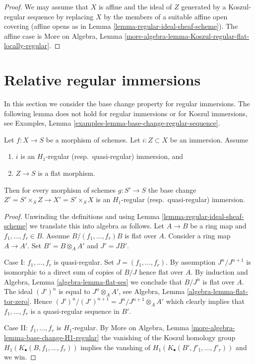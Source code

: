 \begin{proof}
We may assume that $X$ is affine and the ideal of $Z$ generated by
a Koszul-regular sequence by replacing $X$ by the members of a suitable
affine open covering (affine opens as in
Lemma \ref{lemma-regular-ideal-sheaf-scheme}).
The affine case is
More on Algebra,
Lemma \ref{more-algebra-lemma-Koszul-regular-flat-locally-regular}.
\end{proof}





\section{Relative regular immersions}
\label{section-relative-regular-immersion}

\noindent
In this section we consider the base change property for regular immersions.
The following lemma does not hold for regular immersions
or for Koszul immersions, see
Examples, Lemma \ref{examples-lemma-base-change-regular-sequence}.

\begin{lemma}
\label{lemma-relative-regular-immersion}
Let $f : X \to S$ be a morphism of schemes.
Let $i : Z \subset X$ be an immersion.
Assume
\begin{enumerate}
\item $i$ is an $H_1$-regular (resp.\ quasi-regular) immersion, and
\item $Z \to S$ is a flat morphism.
\end{enumerate}
Then for every morphism of schemes $g : S' \to S$ the base change
$Z' = S' \times_S Z \to X' = S' \times_S X$
is an $H_1$-regular (resp.\ quasi-regular) immersion.
\end{lemma}

\begin{proof}
Unwinding the definitions and using
Lemma \ref{lemma-regular-ideal-sheaf-scheme}
we translate this into algebra as follows.
Let $A \to B$ be a ring map and $f_1, \ldots, f_r \in B$.
Assume $B/(f_1, \ldots, f_r)B$ is flat over $A$. Consider a ring
map $A \to A'$. Set $B' = B \otimes_A A'$ and $J' = JB'$.

\medskip\noindent
Case I: $f_1, \ldots, f_r$ is quasi-regular. Set $J = (f_1, \ldots, f_r)$.
By assumption $J^n/J^{n + 1}$ is isomorphic to a direct sum of copies of
$B/J$ hence flat over $A$. By induction and
Algebra, Lemma \ref{algebra-lemma-flat-ses}
we conclude that $B/J^n$ is flat over $A$. The ideal $(J')^n$ is equal to
$J^n \otimes_A A'$, see
Algebra, Lemma \ref{algebra-lemma-flat-tor-zero}.
Hence $(J')^n/(J')^{n + 1} = J^n/J^{n + 1} \otimes_A A'$ which clearly
implies that $f_1, \ldots, f_r$ is a quasi-regular sequence in $B'$.

\medskip\noindent
Case II: $f_1, \ldots, f_r$ is $H_1$-regular. By
More on Algebra, Lemma \ref{more-algebra-lemma-base-change-H1-regular}
the vanishing of the Koszul homology group
$H_1(K_\bullet(B, f_1, \ldots, f_r))$
implies the vanshing of $H_1(K_\bullet(B', f'_1, \ldots, f'_r))$
and we win.
\end{proof}

